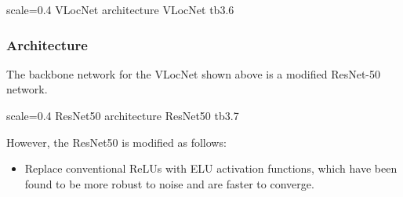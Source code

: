 {scale=0.4}%
{VLocNet architecture}%
{VLocNet}%
{tb3.6} %

\subsubsection{Architecture}
The backbone network for the VLocNet shown above is a modified ResNet-50 network.

{scale=0.4}%
{ResNet50 architecture}%
{ResNet50}%
{tb3.7} %

However, the ResNet50 is modified as follows:

\begin{itemize}
	\item Replace conventional ReLUs with ELU activation functions, which have been found to be more robust to noise and are faster to converge. 
\end{itemize}













